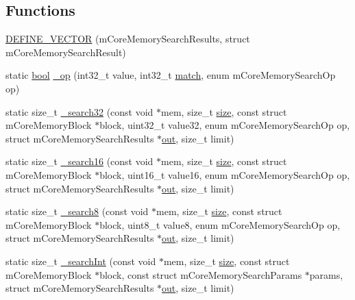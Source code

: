 \subsection*{Functions}
\begin{DoxyCompactItemize}
\item 
\mbox{\hyperlink{mem-search_8c_a9dc0a4130b34dc202f454726953c1754}{D\+E\+F\+I\+N\+E\+\_\+\+V\+E\+C\+T\+OR}} (m\+Core\+Memory\+Search\+Results, struct m\+Core\+Memory\+Search\+Result)
\item 
static \mbox{\hyperlink{libretro_8h_a4a26dcae73fb7e1528214a068aca317e}{bool}} \mbox{\hyperlink{mem-search_8c_a0f60c5ade89ac84c9c4a44fcce11c5b3}{\+\_\+op}} (int32\+\_\+t value, int32\+\_\+t \mbox{\hyperlink{gun_8c_a3ec837ef2cea696af366fcfb455094c6}{match}}, enum m\+Core\+Memory\+Search\+Op op)
\item 
static size\+\_\+t \mbox{\hyperlink{mem-search_8c_aef1a36a86840034ac9b64b277a9c78b8}{\+\_\+search32}} (const void $\ast$mem, size\+\_\+t \mbox{\hyperlink{ioapi_8h_a014d89bd76f74ef3a29c8f04b473eb76}{size}}, const struct m\+Core\+Memory\+Block $\ast$block, uint32\+\_\+t value32, enum m\+Core\+Memory\+Search\+Op op, struct m\+Core\+Memory\+Search\+Results $\ast$\mbox{\hyperlink{gun_8c_acb2d4658684492100bc328998f52ae82}{out}}, size\+\_\+t limit)
\item 
static size\+\_\+t \mbox{\hyperlink{mem-search_8c_aa1dc9e477a1b7df5ce90e5bae240e763}{\+\_\+search16}} (const void $\ast$mem, size\+\_\+t \mbox{\hyperlink{ioapi_8h_a014d89bd76f74ef3a29c8f04b473eb76}{size}}, const struct m\+Core\+Memory\+Block $\ast$block, uint16\+\_\+t value16, enum m\+Core\+Memory\+Search\+Op op, struct m\+Core\+Memory\+Search\+Results $\ast$\mbox{\hyperlink{gun_8c_acb2d4658684492100bc328998f52ae82}{out}}, size\+\_\+t limit)
\item 
static size\+\_\+t \mbox{\hyperlink{mem-search_8c_a109715625d99b7db170075ecdc68363e}{\+\_\+search8}} (const void $\ast$mem, size\+\_\+t \mbox{\hyperlink{ioapi_8h_a014d89bd76f74ef3a29c8f04b473eb76}{size}}, const struct m\+Core\+Memory\+Block $\ast$block, uint8\+\_\+t value8, enum m\+Core\+Memory\+Search\+Op op, struct m\+Core\+Memory\+Search\+Results $\ast$\mbox{\hyperlink{gun_8c_acb2d4658684492100bc328998f52ae82}{out}}, size\+\_\+t limit)
\item 
static size\+\_\+t \mbox{\hyperlink{mem-search_8c_a1af85652c37edd16f2558ee8b15a4a9f}{\+\_\+search\+Int}} (const void $\ast$mem, size\+\_\+t \mbox{\hyperlink{ioapi_8h_a014d89bd76f74ef3a29c8f04b473eb76}{size}}, const struct m\+Core\+Memory\+Block $\ast$block, const struct m\+Core\+Memory\+Search\+Params $\ast$params, struct m\+Core\+Memory\+Search\+Results $\ast$\mbox{\hyperlink{gun_8c_acb2d4658684492100bc328998f52ae82}{out}}, size\+\_\+t limit)

\end{DoxyCompactItemize}
